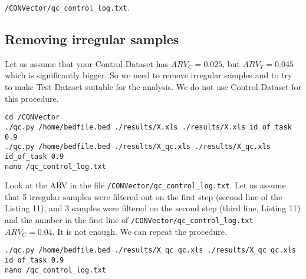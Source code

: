 \documentclass{article}
\begin{document}
\texttt{/CONVector/qc\_control\_log.txt}.




\subsection{Removing irregular samples}

\hypertarget{removeIrrSamples}{}


\begin{usecase}
\end{usecase}

Let us assume that your Control Dataset has $ARV_C = 0.025$, but $ARV_T = 0.045$ which is significantly bigger. So we need to remove irregular samples and to try to make Test Dataset suitable for the analysis. We do not use Control Dataset for this procedure.

\begin{lstlisting}[style=DOS, caption={How to remove irregular samples}]
cd /CONVector
./qc.py /home/bedfile.bed ./results/X.xls ./results/X.xls id_of_task 0.9
./qc.py /home/bedfile.bed ./results/X_qc.xls ./results/X_qc.xls id_of_task 0.9
nano /qc_control_log.txt
\end{lstlisting}

Look at the ARV in the file \texttt{/CONVector/qc\_control\_log.txt}. Let us assume that 5 irregular samples were filtered out on the first step (second line of the Listing 11), and 3 samples were filtered on the second step (third line, Listing 11) and the number in the first line of \texttt{/CONVector/qc\_control\_log.txt} $ARV_C = 0.04$. It is not enough. We can repeat the procedure.

\begin{lstlisting}[style=DOS, caption={How to remove irregular samples iteratively}]
./qc.py /home/bedfile.bed ./results/X_qc_qc.xls ./results/X_qc_qc.xls id_of_task 0.9
nano /qc_control_log.txt
\end{lstlisting}
\end{document}
